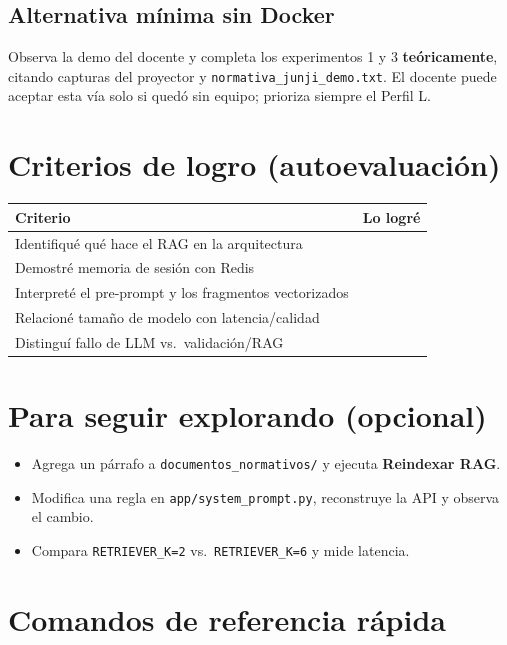\documentclass[12pt,a4paper]{article}
\newcommand{\checkbox}{\fbox{\rule{0pt}{1.5ex}\rule{1.5ex}{0pt}}}
\begin{document}
\subsection{Alternativa mínima sin Docker}

Observa la demo del docente y completa los experimentos 1 y 3 \textbf{teóricamente},
citando capturas del proyector y \texttt{normativa\_junji\_demo.txt}. El docente
puede aceptar esta vía solo si quedó sin equipo; prioriza siempre el Perfil L.

\section{Criterios de logro (autoevaluación)}

\begin{table}[h]
\centering
\begin{tabular}{@{}lc@{}}
\toprule
\textbf{Criterio} & \textbf{Lo logré} \\
\midrule
Identifiqué qué hace el RAG en la arquitectura & \checkbox \\[0.8ex]
Demostré memoria de sesión con Redis & \checkbox \\[0.8ex]
Interpreté el pre-prompt y los fragmentos vectorizados & \checkbox \\[0.8ex]
Relacioné tamaño de modelo con latencia/calidad & \checkbox \\[0.8ex]
Distinguí fallo de LLM vs.\ validación/RAG & \checkbox \\
\bottomrule
\end{tabular}
\end{table}

\section{Para seguir explorando (opcional)}

\begin{itemize}[noitemsep]
  \item Agrega un párrafo a \texttt{documentos\_normativos/} y ejecuta
        \textbf{Reindexar RAG}.
  \item Modifica una regla en \texttt{app/system\_prompt.py}, reconstruye la API
        y observa el cambio.
  \item Compara \texttt{RETRIEVER\_K=2} vs.\ \texttt{RETRIEVER\_K=6} y mide latencia.
\end{itemize}

\section{Comandos de referencia rápida}
\end{document}
